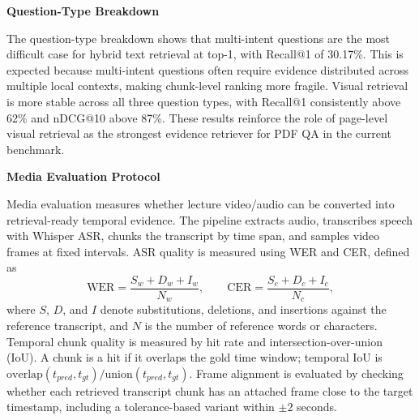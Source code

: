 \textbf{Question-Type Breakdown}

\begin{table}[H]
    \centering
    \caption{Retrieval Performance by Question Type}
    \label{tab:retrieval_by_question_type}
\end{table}

The question-type breakdown shows that multi-intent questions are the most difficult case for hybrid text retrieval at top-1, with Recall@1 of 30.17\%. This is expected because multi-intent questions often require evidence distributed across multiple local contexts, making chunk-level ranking more fragile. Visual retrieval is more stable across all three question types, with Recall@1 consistently above 62\% and nDCG@10 above 87\%. These results reinforce the role of page-level visual retrieval as the strongest evidence retriever for PDF QA in the current benchmark.

\textbf{Media Evaluation Protocol}

Media evaluation measures whether lecture video/audio can be converted into retrieval-ready temporal evidence. The pipeline extracts audio, transcribes speech with Whisper ASR, chunks the transcript by time span, and samples video frames at fixed intervals. ASR quality is measured using WER and CER, defined as
\[
\mathrm{WER}=\dfrac{S_w+D_w+I_w}{N_w},\qquad
\mathrm{CER}=\dfrac{S_c+D_c+I_c}{N_c},
\]
where $S$, $D$, and $I$ denote substitutions, deletions, and insertions against the reference transcript, and $N$ is the number of reference words or characters. Temporal chunk quality is measured by hit rate and intersection-over-union (IoU). A chunk is a hit if it overlaps the gold time window; temporal IoU is $\mathrm{overlap}(t_{pred},t_{gt})/\mathrm{union}(t_{pred},t_{gt})$. Frame alignment is evaluated by checking whether each retrieved transcript chunk has an attached frame close to the target timestamp, including a tolerance-based variant within $\pm 2$ seconds.

